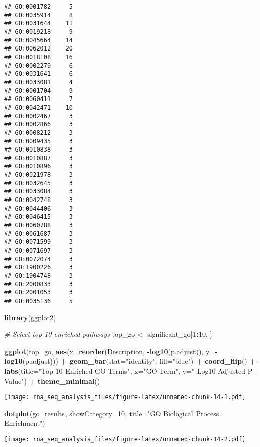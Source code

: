 \documentclass[
]{article}
\newenvironment{Shaded}{\begin{snugshade}}{\end{snugshade}}
\newcommand{\AttributeTok}[1]{\textcolor[rgb]{0.13,0.29,0.53}{#1}}
\newcommand{\CommentTok}[1]{\textcolor[rgb]{0.56,0.35,0.01}{\textit{#1}}}
\newcommand{\DecValTok}[1]{\textcolor[rgb]{0.00,0.00,0.81}{#1}}
\newcommand{\FunctionTok}[1]{\textcolor[rgb]{0.13,0.29,0.53}{\textbf{#1}}}
\newcommand{\NormalTok}[1]{#1}
\newcommand{\OtherTok}[1]{\textcolor[rgb]{0.56,0.35,0.01}{#1}}
\newcommand{\SpecialCharTok}[1]{\textcolor[rgb]{0.81,0.36,0.00}{\textbf{#1}}}
\newcommand{\StringTok}[1]{\textcolor[rgb]{0.31,0.60,0.02}{#1}}
\begin{document}
\begin{verbatim}
## GO:0001782     5
## GO:0035914     8
## GO:0031644    11
## GO:0019218     9
## GO:0045664    14
## GO:0062012    20
## GO:0018108    16
## GO:0002279     6
## GO:0031641     6
## GO:0033081     4
## GO:0001704     9
## GO:0060411     7
## GO:0042471    10
## GO:0002467     3
## GO:0002866     3
## GO:0008212     3
## GO:0009435     3
## GO:0010838     3
## GO:0010887     3
## GO:0010896     3
## GO:0021978     3
## GO:0032645     3
## GO:0033084     3
## GO:0042748     3
## GO:0044406     3
## GO:0046415     3
## GO:0060788     3
## GO:0061687     3
## GO:0071599     3
## GO:0071697     3
## GO:0072074     3
## GO:1900226     3
## GO:1904748     3
## GO:2000833     3
## GO:2001053     3
## GO:0035136     5
\end{verbatim}

\begin{Shaded}
\begin{Highlighting}[]
\FunctionTok{library}\NormalTok{(ggplot2)}

\CommentTok{\# Select top 10 enriched pathways}
\NormalTok{top\_go }\OtherTok{\textless{}{-}}\NormalTok{ significant\_go[}\DecValTok{1}\SpecialCharTok{:}\DecValTok{10}\NormalTok{, ]}

\FunctionTok{ggplot}\NormalTok{(top\_go, }\FunctionTok{aes}\NormalTok{(}\AttributeTok{x=}\FunctionTok{reorder}\NormalTok{(Description, }\SpecialCharTok{{-}}\FunctionTok{log10}\NormalTok{(p.adjust)), }\AttributeTok{y=}\SpecialCharTok{{-}}\FunctionTok{log10}\NormalTok{(p.adjust))) }\SpecialCharTok{+}
  \FunctionTok{geom\_bar}\NormalTok{(}\AttributeTok{stat=}\StringTok{"identity"}\NormalTok{, }\AttributeTok{fill=}\StringTok{"blue"}\NormalTok{) }\SpecialCharTok{+}
  \FunctionTok{coord\_flip}\NormalTok{() }\SpecialCharTok{+}
  \FunctionTok{labs}\NormalTok{(}\AttributeTok{title=}\StringTok{"Top 10 Enriched GO Terms"}\NormalTok{, }\AttributeTok{x=}\StringTok{"GO Term"}\NormalTok{, }\AttributeTok{y=}\StringTok{"{-}Log10 Adjusted P{-}Value"}\NormalTok{) }\SpecialCharTok{+}
  \FunctionTok{theme\_minimal}\NormalTok{()}
\end{Highlighting}
\end{Shaded}

\texttt{[image: rna\_seq\_analysis\_files/figure-latex/unnamed-chunk-14-1.pdf]}

\begin{Shaded}
\begin{Highlighting}[]
\FunctionTok{dotplot}\NormalTok{(go\_results, }\AttributeTok{showCategory=}\DecValTok{10}\NormalTok{, }\AttributeTok{title=}\StringTok{"GO Biological Process Enrichment"}\NormalTok{)}
\end{Highlighting}
\end{Shaded}

\texttt{[image: rna\_seq\_analysis\_files/figure-latex/unnamed-chunk-14-2.pdf]}
\end{document}
